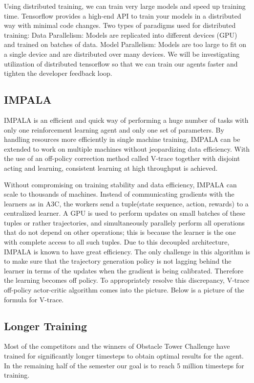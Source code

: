 \documentclass[conference]{IEEEtran}
\begin{document}
Using distributed training, we can train very large models and speed up training time. Tensorflow provides a high-end API to train your models in a distributed way with minimal code changes.  Two types of paradigms used for distributed training:
Data Parallelism: Models are replicated into different devices (GPU) and trained on batches of data.
Model Parallelism: Models are too large to fit on a single device and are distributed over many devices.
We will be investigating utilization of distributed tensorflow so that we can train our agents faster and tighten the developer feedback loop.

\subsection{\textbf{IMPALA}}

IMPALA \cite{Espeholt-et-al} is an efficient and quick way of performing a huge number of tasks with only one reinforcement learning agent and only one set of parameters. By handling resources more efficiently in  single machine training, IMPALA can be extended to work on multiple machines without jeopardizing data efficiency. With the use of an off-policy correction method called V-trace together with disjoint acting and learning, consistent learning at high throughput is achieved.

Without compromising on training stability and data efficiency, IMPALA can scale to thousands of machines. Instead of communicating gradients with the learners as in A3C, the workers send a tuple(state sequence, action, rewards) to a centralized learner. A GPU is used to perform updates on small batches of these tuples or rather trajectories, and simultaneously parallely perform all operations that do not depend on other operations; this is because the learner is the one with complete access to all such tuples. Due to this decoupled architecture, IMPALA is known to have great efficiency. The only challenge in this algorithm is to make sure that the trajectory generation policy is not lagging behind the learner in terms of the updates when the gradient is being calibrated. Therefore the learning becomes off policy. To appropriately resolve this discrepancy,  V-trace off-policy actor-critic algorithm comes into the picture. Below is a picture of the formula for V-trace.

\subsection{\textbf{Longer Training}}
Most of the competitors and the winners of Obstacle Tower Challenge have trained for significantly longer timesteps to obtain optimal results for the agent. In the remaining half of the semester our goal is to reach 5 million timesteps for training.
\end{document}
